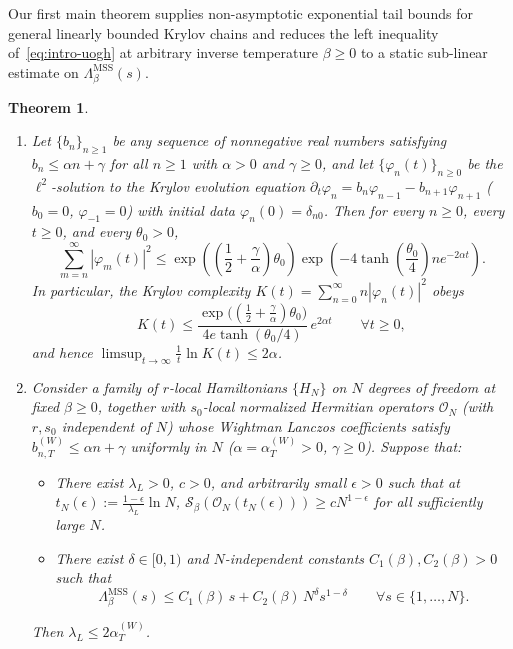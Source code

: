 \documentclass[11pt,a4paper]{article}
\numberwithin{equation}{section}
\theoremstyle{plain}
\newtheorem{theorem}{Theorem}[section]
\theoremstyle{definition}
\newcommand{\MSS}{\mathrm{MSS}}
\begin{document}
Our first main theorem supplies non-asymptotic exponential tail bounds for general linearly bounded Krylov chains and reduces the left inequality of~\eqref{eq:intro-uogh} at arbitrary inverse temperature $\beta\ge 0$ to a static sub-linear estimate on $\Lambda_\beta^{\MSS}(s)$.

\begin{theorem}\label{thm:main-tails-reduction}
\begin{enumerate}
  \setlength{\itemsep}{3pt}\setlength{\parskip}{0pt}
  \item[\emph{(a)}] Let $\{b_n\}_{n\ge 1}$ be any sequence of nonnegative real numbers satisfying $b_n \le \alpha n + \gamma$ for all $n\ge 1$ with $\alpha > 0$ and $\gamma \ge 0$, and let $\{\varphi_n(t)\}_{n\ge 0}$ be the $\ell^2$-solution to the Krylov evolution equation $\partial_t\varphi_n = b_n\varphi_{n-1} - b_{n+1}\varphi_{n+1}$ ($b_0=0$, $\varphi_{-1}=0$) with initial data $\varphi_n(0)=\delta_{n0}$. Then for every $n\ge 0$, every $t\ge 0$, and every $\theta_0 > 0$,
  \begin{equation}\label{eq:main-tail}
    \sum_{m=n}^\infty |\varphi_m(t)|^2 \le \exp\!\left(\left(\frac{1}{2}+\frac{\gamma}{\alpha}\right)\theta_0\right)\exp\!\left(-4\tanh\!\left(\frac{\theta_0}{4}\right)ne^{-2\alpha t}\right).
  \end{equation}
  In particular, the Krylov complexity $K(t) = \sum_{n=0}^\infty n|\varphi_n(t)|^2$ obeys
  \begin{equation}\label{eq:main-Kbound}
    K(t) \le \frac{\exp\!\bigl((\frac{1}{2}+\frac{\gamma}{\alpha})\theta_0\bigr)}{4e\tanh(\theta_0/4)}\,e^{2\alpha t} \qquad \forall t\ge 0,
  \end{equation}
  and hence $\limsup_{t\to\infty}\frac{1}{t}\ln K(t) \le 2\alpha$.
  \item[\emph{(b)}] Consider a family of $r$-local Hamiltonians $\{H_N\}$ on $N$ degrees of freedom at fixed $\beta\ge 0$, together with $s_0$-local normalized Hermitian operators $\mathcal{O}_N$ (with $r, s_0$ independent of $N$) whose Wightman Lanczos coefficients satisfy $b_{n,T}^{(W)} \le \alpha n + \gamma$ uniformly in $N$ ($\alpha = \alpha_T^{(W)} > 0$, $\gamma \ge 0$). Suppose that:
  \begin{itemize}
    \setlength{\itemsep}{2pt}\setlength{\parskip}{0pt}
    \item[\emph{(H1)}] There exist $\lambda_L > 0$, $c > 0$, and arbitrarily small $\epsilon > 0$ such that at $t_N(\epsilon) := \frac{1-\epsilon}{\lambda_L}\ln N$, $\mathcal{S}_\beta(\mathcal{O}_N(t_N(\epsilon))) \ge c N^{1-\epsilon}$ for all sufficiently large $N$.
    \item[\emph{(H2)}] There exist $\delta\in[0,1)$ and $N$-independent constants $C_1(\beta), C_2(\beta) > 0$ such that
    \begin{equation}\label{eq:main-H2}
      \Lambda_\beta^{\MSS}(s) \le C_1(\beta)\,s + C_2(\beta)\,N^\delta s^{1-\delta} \qquad \forall s\in\{1,\dots,N\}.
    \end{equation}
  \end{itemize}
  Then $\lambda_L \le 2\alpha_T^{(W)}$.
\end{enumerate}
\end{theorem}
\end{document}
